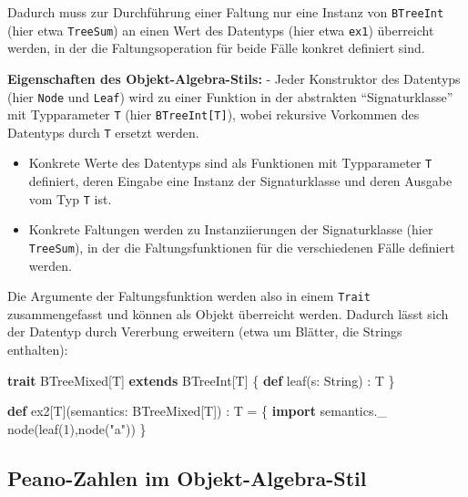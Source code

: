 \documentclass[]{article}
\newenvironment{Shaded}{}{}
\newcommand{\DecValTok}[1]{\textcolor[rgb]{0.25,0.63,0.44}{#1}}
\newcommand{\FunctionTok}[1]{\textcolor[rgb]{0.02,0.16,0.49}{#1}}
\newcommand{\KeywordTok}[1]{\textcolor[rgb]{0.00,0.44,0.13}{\textbf{#1}}}
\newcommand{\NormalTok}[1]{#1}
\newcommand{\StringTok}[1]{\textcolor[rgb]{0.25,0.44,0.63}{#1}}
\begin{document}
Dadurch muss zur Durchführung einer Faltung nur eine Instanz von
\texttt{BTreeInt} (hier etwa \texttt{TreeSum}) an einen Wert des
Datentyps (hier etwa \texttt{ex1}) überreicht werden, in der die
Faltungsoperation für beide Fälle konkret definiert sind.

\textbf{Eigenschaften des Objekt-Algebra-Stils:} - Jeder Konstruktor des
Datentyps (hier \texttt{Node} und \texttt{Leaf}) wird zu einer Funktion
in der abstrakten ``Signaturklasse'' mit Typparameter \texttt{T} (hier
\texttt{BTreeInt{[}T{]}}), wobei rekursive Vorkommen des Datentyps durch
\texttt{T} ersetzt werden.

\begin{itemize}
\item
  Konkrete Werte des Datentyps sind als Funktionen mit Typparameter
  \texttt{T} definiert, deren Eingabe eine Instanz der Signaturklasse
  und deren Ausgabe vom Typ \texttt{T} ist.
\item
  Konkrete Faltungen werden zu Instanziierungen der Signaturklasse (hier
  \texttt{TreeSum}), in der die Faltungsfunktionen für die verschiedenen
  Fälle definiert werden.
\end{itemize}

Die Argumente der Faltungsfunktion werden also in einem \texttt{Trait}
zusammengefasst und können als Objekt überreicht werden. Dadurch lässt
sich der Datentyp durch Vererbung erweitern (etwa um Blätter, die
Strings enthalten):

\begin{Shaded}
\begin{Highlighting}[]
\KeywordTok{trait}\NormalTok{ BTreeMixed[T] }\KeywordTok{extends}\NormalTok{ BTreeInt[T] \{}
  \KeywordTok{def} \FunctionTok{leaf}\NormalTok{(s: String) : T}
\NormalTok{\}}

\KeywordTok{def}\NormalTok{ ex2[T](semantics: BTreeMixed[T]) : T = \{}
  \KeywordTok{import}\NormalTok{ semantics.}\FunctionTok{\_}
  \FunctionTok{node}\NormalTok{(}\FunctionTok{leaf}\NormalTok{(}\DecValTok{1}\NormalTok{),}\FunctionTok{node}\NormalTok{(}\StringTok{"a"}\NormalTok{))}
\NormalTok{\}}
\end{Highlighting}
\end{Shaded}

\hypertarget{peano-zahlen-im-objekt-algebra-stil}{%
\subsection{Peano-Zahlen im
Objekt-Algebra-Stil}\label{peano-zahlen-im-objekt-algebra-stil}}
\end{document}

